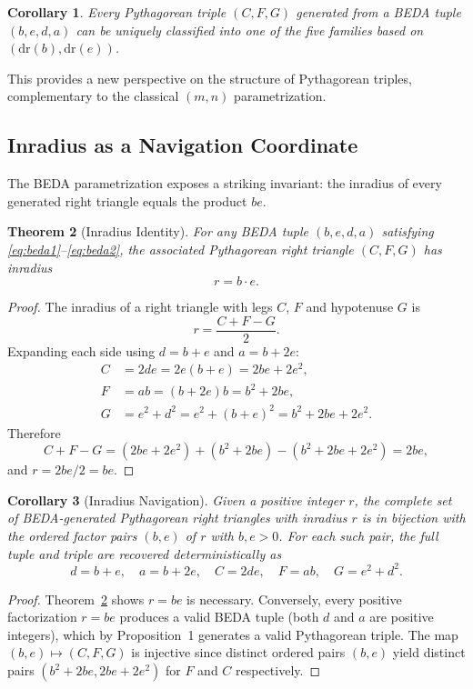 \documentclass[12pt]{article}
\newtheorem{theorem}{Theorem}
\newtheorem{corollary}[theorem]{Corollary}
\begin{document}
\begin{corollary}
Every Pythagorean triple $(C, F, G)$ generated from a BEDA tuple $(b, e, d, a)$ can be uniquely classified into one of the five families based on $(\text{dr}(b), \text{dr}(e))$.
\end{corollary}

This provides a new perspective on the structure of Pythagorean triples, complementary to the classical $(m, n)$ parametrization.

\subsection{Inradius as a Navigation Coordinate}\label{sec:inradius}

The BEDA parametrization exposes a striking invariant: the inradius of every generated right triangle equals the product $be$.

\begin{theorem}[Inradius Identity]\label{thm:inradius}
For any BEDA tuple $(b, e, d, a)$ satisfying \eqref{eq:beda1}--\eqref{eq:beda2}, the associated Pythagorean right triangle $(C, F, G)$ has inradius
\[
  r = b \cdot e.
\]
\end{theorem}

\begin{proof}
The inradius of a right triangle with legs $C$, $F$ and hypotenuse $G$ is
\[
  r = \frac{C + F - G}{2}.
\]
Expanding each side using $d = b+e$ and $a = b+2e$:
\begin{align*}
  C &= 2de = 2e(b+e) = 2be + 2e^2,\\
  F &= ab = (b+2e)b = b^2 + 2be,\\
  G &= e^2 + d^2 = e^2 + (b+e)^2 = b^2 + 2be + 2e^2.
\end{align*}
Therefore
\[
  C + F - G = (2be + 2e^2) + (b^2 + 2be) - (b^2 + 2be + 2e^2) = 2be,
\]
and $r = 2be/2 = be$.
\end{proof}

\begin{corollary}[Inradius Navigation]\label{cor:nav}
Given a positive integer $r$, the complete set of BEDA-generated Pythagorean right triangles with inradius $r$ is in bijection with the ordered factor pairs $(b, e)$ of $r$ with $b, e > 0$.  For each such pair, the full tuple and triple are recovered deterministically as
\[
  d = b + e, \quad a = b + 2e, \quad C = 2de, \quad F = ab, \quad G = e^2 + d^2.
\]
\end{corollary}

\begin{proof}
Theorem~\ref{thm:inradius} shows $r = be$ is necessary.  Conversely, every positive factorization $r = be$ produces a valid BEDA tuple (both $d$ and $a$ are positive integers), which by Proposition~1 generates a valid Pythagorean triple.  The map $(b,e) \mapsto (C,F,G)$ is injective since distinct ordered pairs $(b,e)$ yield distinct pairs $(b^2{+}2be, 2be{+}2e^2)$ for $F$ and $C$ respectively.
\end{proof}
\end{document}
